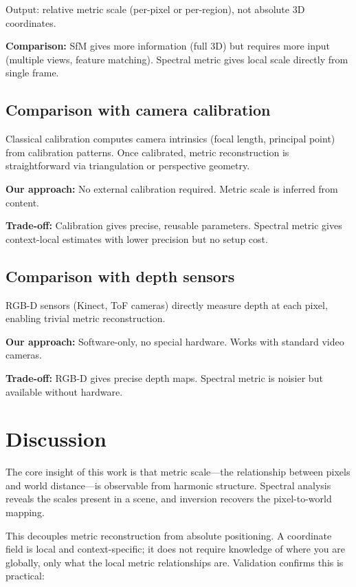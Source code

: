 \documentclass[11pt,twocolumn,a4paper]{article}
\theoremstyle{definition}
\begin{document}
Output: relative metric scale (per-pixel or per-region), not absolute 3D coordinates.

\textbf{Comparison:} SfM gives more information (full 3D) but requires more input (multiple views, feature matching). Spectral metric gives local scale directly from single frame.

\subsection{Comparison with camera calibration}

Classical calibration \citep{zhang2000,hartley2003} computes camera intrinsics (focal length, principal point) from calibration patterns. Once calibrated, metric reconstruction is straightforward via triangulation or perspective geometry.

\textbf{Our approach:} No external calibration required. Metric scale is inferred from content.

\textbf{Trade-off:} Calibration gives precise, reusable parameters. Spectral metric gives context-local estimates with lower precision but no setup cost.

\subsection{Comparison with depth sensors}

RGB-D sensors (Kinect, ToF cameras) directly measure depth at each pixel, enabling trivial metric reconstruction.

\textbf{Our approach:} Software-only, no special hardware. Works with standard video cameras.

\textbf{Trade-off:} RGB-D gives precise depth maps. Spectral metric is noisier but available without hardware.
\section{Discussion}

The core insight of this work is that metric scale—the relationship between pixels and world distance—is observable from harmonic structure. Spectral analysis reveals the scales present in a scene, and inversion recovers the pixel-to-world mapping.

This decouples metric reconstruction from absolute positioning. A coordinate field is local and context-specific; it does not require knowledge of where you are globally, only what the local metric relationships are. Validation confirms this is practical:
\end{document}
